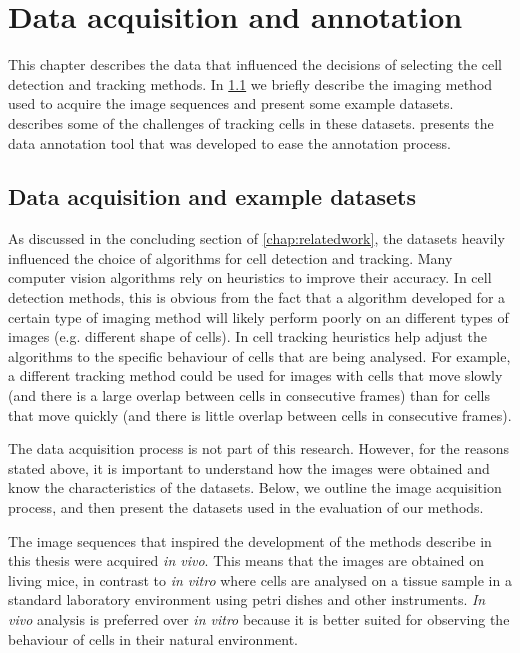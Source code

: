 \chapter{Data acquisition and annotation \statusfirstdraft}
	\label{chap:data}
	
	This chapter describes the data that influenced the decisions of selecting the cell detection and tracking methods. In \cref{sec:data_examples} we briefly describe the imaging method used to acquire the image sequences and present some example datasets.  describes some of the challenges of tracking cells in these datasets.  presents the data annotation tool that was developed to ease the annotation process.

    \section{Data acquisition and example datasets }
    \label{sec:data_examples}
    
    As discussed in the concluding section of \cref{chap:relatedwork}, the datasets heavily influenced the choice of algorithms for cell detection and tracking. Many computer vision algorithms rely on heuristics to improve their accuracy. In cell detection methods, this is obvious from the fact that a algorithm developed for a certain type of imaging method will likely perform poorly on an different types of images (e.g. different shape of cells). In cell tracking heuristics help adjust the algorithms to the specific behaviour of cells that are being analysed. For example, a different tracking method could be used for images with cells that move slowly (and there is a large overlap between cells in consecutive frames) than for cells that move quickly (and there is little overlap between cells in consecutive frames).
    
    The data acquisition process is not part of this research. However, for the reasons stated above, it is important to understand how the images were obtained and know the characteristics of the datasets. Below, we outline the image acquisition process, and then present the datasets used in the evaluation of our methods.
    
    The image sequences that inspired the development of the methods describe in this thesis were acquired \textit{in vivo}. This means that the images are obtained on living mice, in contrast to \textit{in vitro} where cells are analysed on a tissue sample in a standard laboratory environment using petri dishes and other instruments. \textit{In vivo} analysis is preferred over \textit{in vitro} because it is better suited for observing the behaviour of cells in their natural environment.
    
